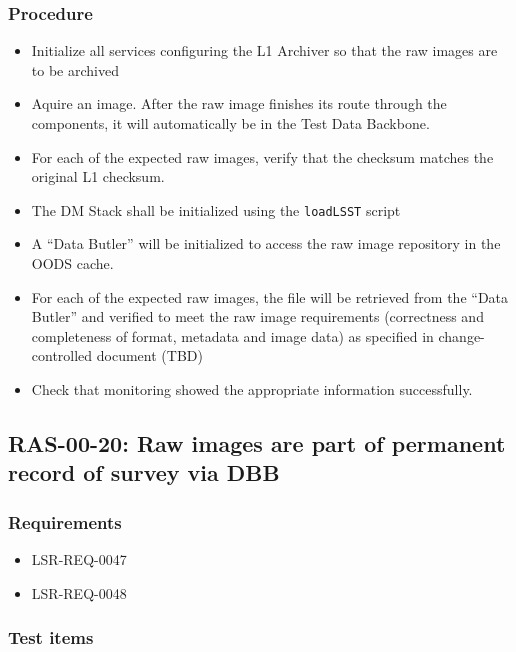 \documentclass[DM,lsstdraft,STS,toc]{lsstdoc}
\begin{document}
\subsubsection{Procedure}


\begin{itemize}
\item{Initialize all services configuring the L1 Archiver so that the raw images are to be archived}
\item{Aquire an image. After the raw image finishes its route through the components, it
will automatically be in the Test Data Backbone.}
\item{For each of the expected raw images, verify that the checksum matches the original L1 checksum.}
\item{The DM Stack shall be initialized using the \texttt{loadLSST} script}
\item{A ``Data Butler'' will be initialized to access the raw image repository in the OODS cache.}
\item{For each of the expected raw images, the file will be retrieved from the ``Data Butler'' and verified to meet the raw image requirements (correctness and completeness of format, metadata and image data) as specified in change-controlled document (TBD)}
\item{Check that monitoring showed the appropriate information successfully.}
\end{itemize}




\subsection{RAS-00-20: Raw images are part of permanent record of survey via DBB}
\label{ras-00-20}


\subsubsection{Requirements}


\begin{itemize}
\item{LSR-REQ-0047}
\item{LSR-REQ-0048}
\end{itemize}


\subsubsection{Test items}
\end{document}
